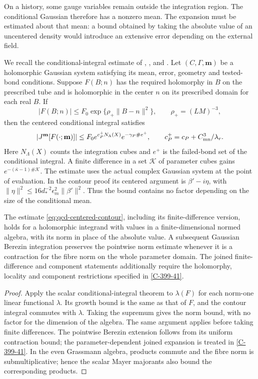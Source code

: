 \documentclass[11pt,letterpaper,reqno]{amsart}
\makeatletter
\theoremstyle{definition}
\newcommand{\ms@minorstart}{%
  \pushQED{\qed}\renewcommand{\qedsymbol}{$\blacksquare$}}
\newenvironment{lemma}[1][]{\ms@minorstart\ms@lemma[#1]}
  {\popQED\endms@lemma}
\theoremstyle{remark}
\makeatother
\begin{document}
On a history, some gauge variables remain outside the integration
region. The conditional Gaussian therefore has a nonzero mean.
The expansion must be estimated about that mean: a bound obtained
by taking the absolute value of an uncentered density would introduce
an extensive error depending on the external field.

We recall the conditional-integral estimate of
\cite[Prop.~5.12]{YMM1}, \cite[Lem.~5.13]{YMM1}, and \cite[Prop.~5.14]{YMM1}.
Let $(C,\Gamma,\mathbf m)$
be a holomorphic Gaussian system satisfying its mean, error,
geometry and tested-bond conditions. Suppose $F(B;n)$ has the
required holomorphy in $B$ on the prescribed tube and is
holomorphic in the center $n$ on its prescribed domain for
each real $B$. If
\[
 |F(B;n)|\le F_0\exp\{\rho_+\|B-n\|^2\},
 \qquad \rho_+=(LM)^{-3},
\]
then the centered conditional integral satisfies
\begin{equation}\label{eq:qcd-centered-contour}
 |J^{\mathbf m}[F(\cdot;\mathbf m)]|
 \le F_0 e^{c_P^+N_\Lambda(X)}e^{-\gamma_P\#e^+},
 \qquad c_P^+=c_P+C_{\rm mn}^3/\lambda_r.
\end{equation}
Here $N_\Lambda(X)$ counts the integration cubes and $e^+$ is
the failed-bond set of the conditional integral. A finite
difference in a set $\mathcal K$ of parameter cubes gains
$e^{-(\bar\kappa-1)\#\mathcal K}$. The estimate uses the
actual complex Gaussian system at the point of evaluation.
In the contour proof its centered argument is $\beta'-i\eta$,
with $\|\eta\|^2\le16d_*^{-2}\epsilon_m^2\|\beta'\|^2$.
Thus the bound contains no factor depending on the size of
the conditional mean.

\begin{lemma}[Algebra-valued conditional integration]
\label{lem:qcd-centered-interface}
The estimate \eqref{eq:qcd-centered-contour}, including its
finite-difference version, holds for a holomorphic integrand
with values in a finite-dimensional normed algebra, with its
norm in place of the absolute value. A subsequent Gaussian
Berezin integration preserves the pointwise norm estimate
whenever it is a contraction for the fibre norm on the whole
parameter domain. The joined finite-difference and component
statements additionally require the holomorphy, locality and
component restrictions specified in \cref{C-399-41}.
\end{lemma}

\begin{proof}
Apply the scalar conditional-integral theorem to
$\lambda(F)$ for each norm-one linear functional $\lambda$.
Its growth bound is the same as that of $F$, and the contour
integral commutes with $\lambda$. Taking the supremum gives
the norm bound, with no factor for the dimension of the algebra.
The same argument applies before taking finite differences.
The pointwise Berezin extension follows from its uniform
contraction bound; the parameter-dependent joined expansion
is treated in \cref{C-399-41}. In the even Grassmann algebra, products
commute and the fibre norm is submultiplicative; hence the
scalar Mayer majorants also bound the corresponding products.
\end{proof}
\end{document}
